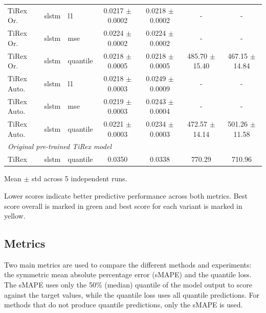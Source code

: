 \documentclass[a4paper,oneside,10pt,ngerman,english]{scrartcl}
\begin{document}
\begin{table}[htbp]
\begin{threeparttable}
\begin{tabular}{lllcccc}
			TiRex Or. & slstm & l1       & \cellcolor[HTML]{006837}\color[HTML]{f1f1f1}0.0217 $\pm$ 0.0002 & 0.0218 $\pm$ 0.0002 & - & - \\
			TiRex Or. & slstm & mse      & \cellcolor[HTML]{fdfebc}0.0224 $\pm$ 0.0002 & \cellcolor[HTML]{fdfebc}0.0224 $\pm$ 0.0002	 & -  & -  \\
			TiRex Or. & slstm & quantile & \cellcolor[HTML]{fdfebc}0.0218 $\pm$ 0.0005 & \cellcolor[HTML]{fdfebc}0.0218 $\pm$ 0.0005 & 485.70 $\pm$ 15.40 & \cellcolor[HTML]{006837}\color[HTML]{f1f1f1}467.15 $\pm$ 14.84 \\
			\addlinespace
			TiRex Auto. & slstm & l1      & \cellcolor[HTML]{fdfebc}0.0218 $\pm$ 0.0003 & 0.0249 $\pm$ 0.0009 & - & - \\
			TiRex Auto. & slstm & mse     & \cellcolor[HTML]{fdfebc}0.0219 $\pm$ 0.0003 & 0.0243 $\pm$ 0.0004 & - & - \\
			TiRex Auto. & slstm & quantile & \cellcolor[HTML]{fdfebc}0.0221 $\pm$ 0.0003 & 0.0234 $\pm$ 0.0003 & 472.57 $\pm$ 14.14 & 501.26 $\pm$ 11.58 \\			
			\midrule
			\multicolumn{7}{l}{{\small \emph{Original pre-trained TiRex model}}}\\
			TiRex & slstm & quantile  & 0.0350 & \cellcolor[HTML]{fdfebc}0.0338 & 770.29  &  710.96  \\
			\bottomrule
		\end{tabular}
		\begin{tablenotes}
			\small
			\item[a] Mean $\pm$ std across 5 independent runs.
			\item[b] Lower scores indicate better predictive performance across both metrics. Best score overall is marked in green and best score for each variant is marked in yellow.
		\end{tablenotes}	
	\end{threeparttable}
\end{table}


\subsection{Metrics}
\label{sec:metrics}

Two main metrics are used to compare the different methods and experiments: the symmetric mean absolute percentage error (sMAPE) and the quantile loss. The sMAPE uses only the 50\% (median) quantile of the model output to score against the target values, while the quantile loss uses all quantile predictions. For methods that do not produce quantile predictions, only the sMAPE is used.
\end{document}
